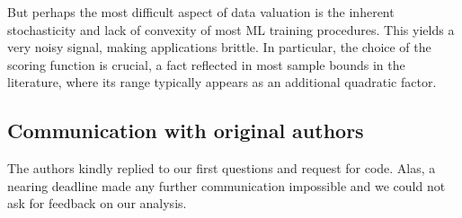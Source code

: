 But perhaps the most difficult aspect of data valuation is the inherent
stochasticity and lack of convexity of most ML training procedures. This
yields a very noisy signal, making applications brittle. In particular, the
choice of the scoring function is crucial, a fact reflected in most sample
bounds in the literature, where its range typically appears as an additional
quadratic factor.

\subsection{Communication with original authors}

The authors kindly replied to our first questions and request for code. Alas,
a nearing deadline made any further communication impossible and we could not
ask for feedback on our analysis.